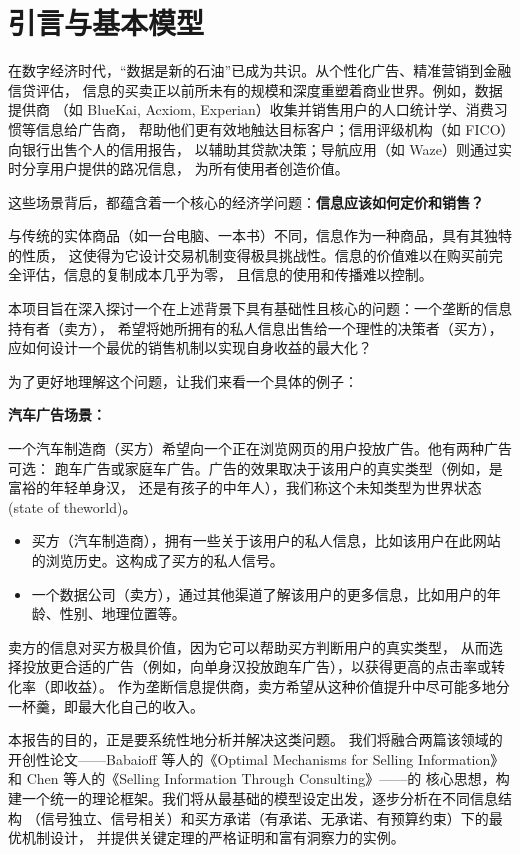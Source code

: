 \section{引言与基本模型}

在数字经济时代，“数据是新的石油”已成为共识。从个性化广告、精准营销到金融信贷评估，
信息的买卖正以前所未有的规模和深度重塑着商业世界。例如，数据提供商
（如 BlueKai, Acxiom, Experian）收集并销售用户的人口统计学、消费习惯等信息给广告商，
帮助他们更有效地触达目标客户；信用评级机构（如 FICO）向银行出售个人的信用报告，
以辅助其贷款决策；导航应用（如 Waze）则通过实时分享用户提供的路况信息，
为所有使用者创造价值。

这些场景背后，都蕴含着一个核心的经济学问题：\textbf{信息应该如何定价和销售？}

与传统的实体商品（如一台电脑、一本书）不同，信息作为一种商品，具有其独特的性质，
这使得为它设计交易机制变得极具挑战性。信息的价值难以在购买前完全评估，信息的复制成本几乎为零，
且信息的使用和传播难以控制。

本项目旨在深入探讨一个在上述背景下具有基础性且核心的问题：一个垄断的信息持有者（卖方），
希望将她所拥有的私人信息出售给一个理性的决策者（买方），
应如何设计一个最优的销售机制以实现自身收益的最大化？

为了更好地理解这个问题，让我们来看一个具体的例子：

\textbf{汽车广告场景：}

一个汽车制造商（买方）希望向一个正在浏览网页的用户投放广告。他有两种广告可选：
跑车广告或家庭车广告。广告的效果取决于该用户的真实类型（例如，是富裕的年轻单身汉，
还是有孩子的中年人），我们称这个未知类型为世界状态 (state of theworld)。

\begin{itemize}
   \item 买方（汽车制造商），拥有一些关于该用户的私人信息，比如该用户在此网站的浏览历史。这构成了买方的私人信号。
   \item 一个数据公司（卖方），通过其他渠道了解该用户的更多信息，比如用户的年龄、性别、地理位置等。
\end{itemize}

卖方的信息对买方极具价值，因为它可以帮助买方判断用户的真实类型，
从而选择投放更合适的广告（例如，向单身汉投放跑车广告），以获得更高的点击率或转化率（即收益）。
作为垄断信息提供商，卖方希望从这种价值提升中尽可能多地分一杯羹，即最大化自己的收入。

本报告的目的，正是要系统性地分析并解决这类问题。
我们将融合两篇该领域的开创性论文——Babaioff 等人的《Optimal Mechanisms for
 Selling Information》和 Chen 等人的《Selling Information Through Consulting》——的
 核心思想，构建一个统一的理论框架。我们将从最基础的模型设定出发，逐步分析在不同信息结构
 （信号独立、信号相关）和买方承诺（有承诺、无承诺、有预算约束）下的最优机制设计，
 并提供关键定理的严格证明和富有洞察力的实例。


